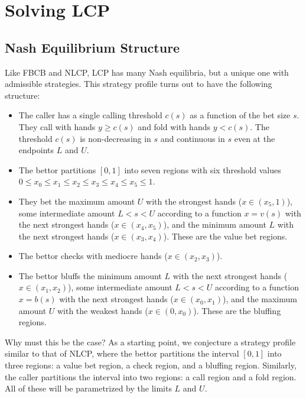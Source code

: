 \documentclass[../../main/main.tex]{subfiles}
\begin{document}
\section{Solving LCP}

\subsection{Nash Equilibrium Structure}


\label{subsec:nash_equilibrium_structure}
Like FBCB and NLCP, LCP has many Nash equilibria, but a unique one with admissible strategies. This strategy profile turns out to have the following structure:

\begin{itemize}
    \item The caller has a single calling threshold $c(s)$ as a function of the bet size $s$. They call with hands $y \geq c(s)$ and fold with hands $y < c(s)$. The threshold $c(s)$ is non-decreasing in $s$ and continuous in $s$ even at the endpoints $L$ and $U$.
    \item The bettor partitions $[0, 1]$ into seven regions with six threshold values $0 \leq x_0\leq x_1\leq x_2\leq x_3 \leq x_4 \leq x_5 \leq 1$. 
    \item They bet the maximum amount $U$ with the strongest hands ($x \in (x_5, 1)$), some intermediate amount $L < s < U$ according to a function $x = v(s)$ with the next strongest hands ($x \in (x_4, x_5)$), and the minimum amount $L$ with the next strongest hands ($x \in (x_3, x_4)$). These are the value bet regions.
    \item The bettor checks with mediocre hands ($x \in (x_2, x_3)$).
    \item The bettor bluffs the minimum amount $L$ with the next strongest hands ($x \in (x_1, x_2)$), some intermediate amount $L < s < U$ according to a function $x = b(s)$ with the next strongest hands ($x \in (x_0, x_1)$), and the maximum amount $U$ with the weakest hands ($x \in (0, x_0)$). These are the bluffing regions.
\end{itemize}

Why must this be the case? As a starting point, we conjecture a strategy profile similar to that of NLCP, where the bettor partitions the interval $[0, 1]$ into three regions: a value bet region, a check region, and a bluffing region. Similarly, the caller partitions the interval into two regions: a call region and a fold region. All of these will be parametrized by the limits $L$ and $U$. 
\end{document}
